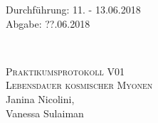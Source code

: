 



\begin{titlepage}
  \begin{flushleft}
 Durchführung: 11. - 13.06.2018\\
 Abgabe: ??.06.2018
  \end{flushleft}


\HRule\\[1,0cm]

 \begin{center}


\textsc{\LARGE Praktikumsprotokoll V01}\\[1.5cm]
\textsc{\huge Lebensdauer kosmischer Myonen} \\[5,5cm]

Janina Nicolini\footnotemark[1], \\
Vanessa Sulaiman\footnotemark[2] \\[1,0cm]



 \end{center}
\HRule

 \vfill

\end{titlepage}






\printbibliography



